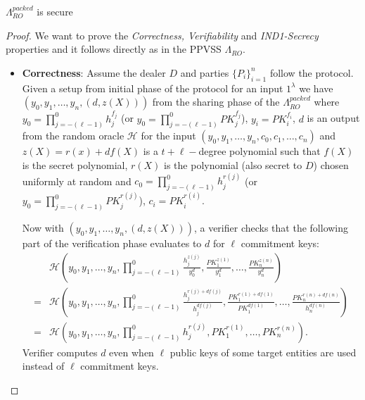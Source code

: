 



\begin{theorem}
  $\Lambda_{RO}^{packed}$ is secure
\end{theorem}
\begin{proof}
  We want to prove the \textit{Correctness, Verifiability} and \textit{IND1-Secrecy} properties and it follows 
  directly as in the PPVSS $\Lambda_{RO}$.
  \begin{itemize}
    \item \textbf{Correctness}: Assume the dealer $D$ and parties $\{P_i\}_{i=1}^n$ follow the protocol. Given a 
      setup from initial phase of the protocol for an input $1^\lambda$ we have $(y_0,y_1,\dots,y_n,(d,z(X)))$ from 
      the sharing phase of the $\Lambda_{RO}^{packed}$ where 
      $y_0=\prod_{j=-(\ell-1)}^{0}h_j^{f_j}$ (or $y_0=\prod_{j=-(\ell-1)}^0PK_j^{f_j}$), $y_i=PK_i^{f_i}$, $d$ is an output 
      from the random oracle $\mathcal{H}$ for the input $(y_0,y_1,\dots,y_n,c_0,c_1,\dots,c_n)$ and $z(X)=r(x)+df(X)$ 
      is a $t+\ell-$degree polynomial such that $f(X)$ is the secret polynomial, $r(X)$ is the polynomial (also secret to $D$) 
      chosen uniformly at random and $c_0=\prod_{j=-(\ell-1)}^{0}h_j^{r(j)}$ (or $y_0=\prod_{j=-(\ell-1)}^0PK_j^{r(j)}$), $c_i=PK_i^{r(i)}$.\par 

      Now with $(y_0,y_1,\dots,y_n,(d,z(X)))$, a verifier checks that the following part of the verification phase evaluates to $d$ 
      for $\ell$ commitment keys:
      \begin{align*}
        &\mathcal{H}(y_0,y_1,\dots,y_n,\prod_{j=-(\ell-1)}^{0}\frac{h_j^{z(j)}}{y_0^d},\frac{PK_1^{z(1)}}{y_1^d},\dots,\frac{PK_n^{z(n)}}{y_n^d})\\
        =&\mathcal{H}(y_0,y_1,\dots,y_n,\prod_{j=-(\ell-1)}^{0}\frac{h_j^{r(j)+df(j)}}{h_j^{df(j)}},\frac{PK_1^{r(1)+df(1)}}{PK_1^{df(1)}},\dots,\frac{PK_n^{r(n)+df(n)}}{h_n^{df(n)}})\\
        =&\mathcal{H}(y_0,y_1,\dots,y_n,\prod_{j=-(\ell-1)}^{0}h_j^{r(j)},PK_1^{r(1)},\dots,PK_n^{r(n)}).
      \end{align*}
      Verifier computes $d$ even when $\ell$ public keys of some target entities are used instead of $\ell$ commitment 
      keys.\par 
      

\end{itemize}
\end{proof}
